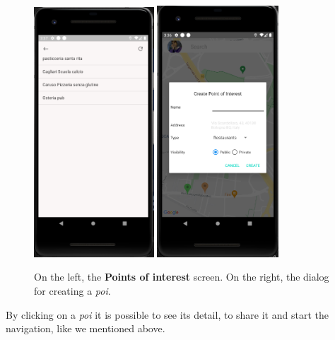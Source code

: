 \documentclass[../../main]{subfiles}
\begin{document}
\begin{figure}[H]
    \centering
    \includegraphics[width=0.4\textwidth]{images/app/poi/poi_overview}
    \includegraphics[width=0.405\textwidth]{images/app/poi/creazione_poi}
    \caption{On the left, the \textbf{Points of interest} screen. On the right, the dialog for creating a \textit{poi}.}
\end{figure}
\noindent
By clicking on a \textit{poi} it is possible to see its detail, to share it and start the navigation, like we mentioned above.
\end{document}

